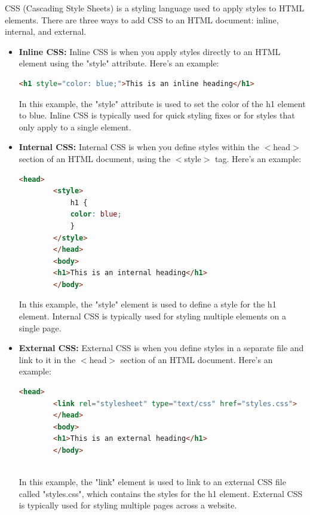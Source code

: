\documentclass[11pt]{article}
\begin{document}
CSS (Cascading Style Sheets) is a styling language used to apply styles to HTML elements. There are three ways to add CSS to an HTML document: inline, internal, and external.

\begin{itemize}
    \item \textbf{Inline CSS:} Inline CSS is when you apply styles directly to an HTML element using the "style" attribute. Here's an example:
    \begin{lstlisting}[language=html]
        <h1 style="color: blue;">This is an inline heading</h1>
    \end{lstlisting}
    
    In this example, the "style" attribute is used to set the color of the h1 element to blue. Inline CSS is typically used for quick styling fixes or for styles that only apply to a single element.
    
    \item \textbf{Internal CSS:} Internal CSS is when you define styles within the $<$head$>$ section of an HTML document, using the $<$style$>$ tag. Here's an example:
    \begin{lstlisting}[language=html]
        <head>
        <style>
            h1 {
            color: blue;
            }
        </style>
        </head>
        <body>
        <h1>This is an internal heading</h1>
        </body>
    \end{lstlisting}
    In this example, the "style" element is used to define a style for the h1 element. Internal CSS is typically used for styling multiple elements on a single page.
    
    \item \textbf{External CSS:} External CSS is when you define styles in a separate file and link to it in the $<$head$>$ section of an HTML document. Here's an example:
    
    \begin{lstlisting}[language=html]
        <head>
        <link rel="stylesheet" type="text/css" href="styles.css">
        </head>
        <body>
        <h1>This is an external heading</h1>
        </body>
     
    \end{lstlisting}
    In this example, the "link" element is used to link to an external CSS file called "styles.css", which contains the styles for the h1 element. External CSS is typically used for styling multiple pages across a website.
    
\end{itemize}
\end{document}
